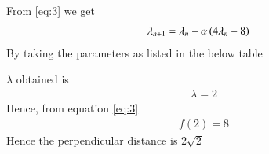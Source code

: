 \documentclass[journal,12pt,twocolumn]{IEEEtran}
\begin{document}
\begin{enumerate}
From \eqref{eq:3} we get
\begin{align}
\lambda_{n+1} &=\lambda_{n} -\alpha \left(4\lambda_n-8\right)
\end{align}
By taking the parameters as listed in the below table
\begin{table}[h]
\centering

\caption{}
\label{tab:1}
\end{table}

$\lambda$ obtained is
\begin{align}
\lambda = 2
\end{align}
Hence, from equation \eqref{eq:3} 
\begin{align}
f(2) = 8
\end{align}
Hence the perpendicular distance is $2\sqrt{2}$
\end{enumerate}
\end{document}

